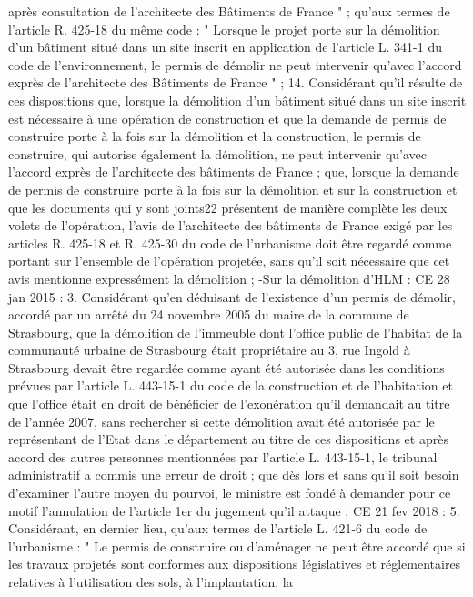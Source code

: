 \documentclass[11pt,a4paper]{report}
\begin{document}
	après consultation de l'architecte des Bâtiments de France " ; qu'aux termes de l'article R. 425-18 du même code
	: " Lorsque le projet porte sur la démolition d'un bâtiment situé dans un site inscrit en application de l'article L.
	341-1 du code de l'environnement, le permis de démolir ne peut intervenir qu'avec l'accord exprès de l'architecte
	des Bâtiments de France " ;
	14. Considérant qu'il résulte de ces dispositions que, lorsque la démolition d'un bâtiment situé dans un site
	inscrit est nécessaire à une opération de construction et que la demande de permis de construire porte à la fois
	sur la démolition et la construction, le permis de construire, qui autorise également la démolition, ne peut
	intervenir qu'avec l'accord exprès de l'architecte des bâtiments de France ; que, lorsque la demande de permis
	de construire porte à la fois sur la démolition et sur la construction et que les documents qui y sont joints22
	présentent de manière complète les deux volets de l'opération, l'avis de l'architecte des bâtiments de France
	exigé par les articles R. 425-18 et R. 425-30 du code de l'urbanisme doit être regardé comme portant sur
	l'ensemble de l'opération projetée, sans qu'il soit nécessaire que cet avis mentionne expressément la démolition ;
	-Sur la démolition d’HLM : CE 28 jan 2015  : 3. Considérant qu'en déduisant de l'existence d'un
	permis de démolir, accordé par un arrêté du 24 novembre 2005 du maire de la commune de Strasbourg, que la
	démolition de l'immeuble dont l'office public de l'habitat de la communauté urbaine de Strasbourg était
	propriétaire au 3, rue Ingold à Strasbourg devait être regardée comme ayant été autorisée dans les conditions
	prévues par l'article L. 443-15-1 du code de la construction et de l'habitation et que l'office était en droit de
	bénéficier de l'exonération qu'il demandait au titre de l'année 2007, sans rechercher si cette démolition avait été
	autorisée par le représentant de l'Etat dans le département au titre de ces dispositions et après accord des autres
	personnes mentionnées par l'article L. 443-15-1, le tribunal administratif a commis une erreur de droit ; que dès
	lors et sans qu'il soit besoin d'examiner l'autre moyen du pourvoi, le ministre est fondé à demander pour ce motif
	l'annulation de l'article 1er du jugement qu'il attaque ;
	CE 21 fev 2018  : 5. Considérant, en dernier lieu, qu'aux termes de l'article L. 421-6 du code de
	l'urbanisme : " Le permis de construire ou d'aménager ne peut être accordé que si les travaux projetés sont
	conformes aux dispositions législatives et réglementaires relatives à l'utilisation des sols, à l'implantation, la
\end{document}
